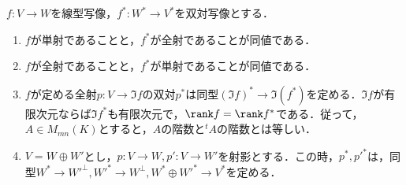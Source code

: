 \documentclass[uplatex, dvipdfmx]{jsreport}
\begin{document}
\begin{corollary}[線型写像の双対命題]\label{cor-duality-of-dual-map}
    $f:V\to W$を線型写像，$f^*:W^*\to V^*$を双対写像とする．
    \begin{enumerate}
        \item $f$が単射であることと，$f^*$が全射であることが同値である．
        \item $f$が全射であることと，$f^*$が単射であることが同値である．
        \item $f$が定める全射$p:V\to \Im f$の双対$p^*$は同型$(\Im f)^*\to\Im(f^*)$を定める．$\Im f$が有限次元ならば$\Im f^*$も有限次元で，$\rank f=\rank f^*$である．従って，$A\in M_{mn}(K)$とすると，$A$の階数と${}^t\!A$の階数とは等しい．
        \item $V=W\oplus W'$とし，$p:V\to W,p':V\to W'$を射影とする．この時，$p^*,p'^*$は，同型$W^*\to W'^\bot,W'^*\to W^\bot,W^*\oplus W'^*\to V^*$を定める．
    \end{enumerate}
\end{corollary}
\end{document}
